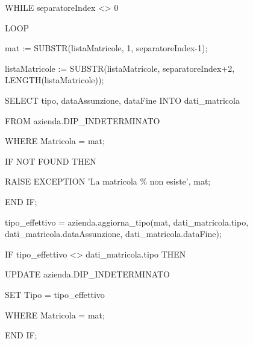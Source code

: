 \begin{flushleft}
\begin{description}
\begin{description}
                        \vspace{0.5cm}

                        \item WHILE separatoreIndex <> 0
                        \item LOOP
                        \begin{description}
                            \item mat := SUBSTR(listaMatricole, 1, separatoreIndex-1);
                            \item listaMatricole := SUBSTR(listaMatricole, separatoreIndex+2, LENGTH(listaMatricole));
                            
                            \vspace{0.5cm}
                            
                            \item SELECT tipo, dataAssunzione, dataFine INTO dati\_matricola
                            \item FROM azienda.DIP\_INDETERMINATO
                            \item WHERE Matricola = mat;
                            
                            \vspace{0.5cm}
                            
                            \item IF NOT FOUND THEN
                                \begin{description}
                                    \item RAISE EXCEPTION 'La matricola \% non esiste', mat;
                                \end{description}
                            \item END IF;

                            \vspace{0.5cm}
                            
                            \item tipo\_effettivo = azienda.aggiorna\_tipo(mat, dati\_matricola.tipo, dati\_matricola.dataAssunzione, dati\_matricola.dataFine);
                            \item IF tipo\_effettivo <> dati\_matricola.tipo THEN
                                \begin{description}
                                    \item UPDATE azienda.DIP\_INDETERMINATO
                                    \item SET Tipo = tipo\_effettivo
                                    \item WHERE Matricola = mat;
                                \end{description}
                            \item END IF;
                    

\end{description}
\end{description}
\end{description}
\end{flushleft}
